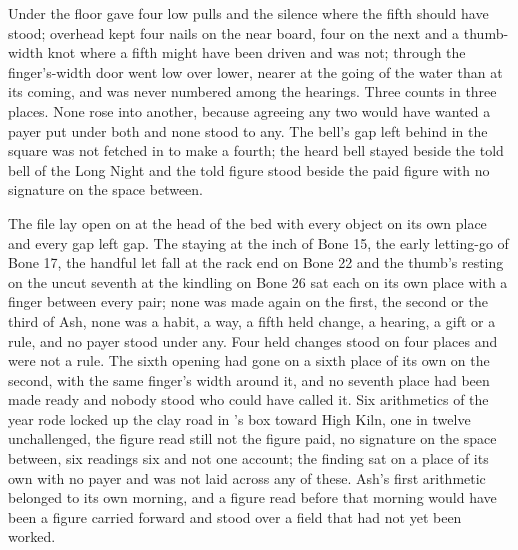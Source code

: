 Under the floor  gave four low pulls and the silence where the fifth should have stood; overhead  kept four nails on the near board, four on the next and a thumb-width knot where a fifth might have been driven and was not; through the finger's-width door  went low over lower, nearer at the going of the water than at its coming, and was never numbered among the hearings. Three counts in three places. None rose into another, because agreeing any two would have wanted a payer put under both and none stood to any. The bell's gap left behind in the square was not fetched in to make a fourth; the heard bell stayed beside the told bell of the Long Night and the told figure stood beside the paid figure with no signature on the space between.

The file lay open on  at the head of the bed with every object on its own place and every gap left gap. The staying at the inch of Bone 15, the early letting-go of Bone 17, the handful let fall at the rack end on Bone 22 and the thumb's resting on the uncut seventh at the kindling on Bone 26 sat each on its own place with a finger between every pair; none was made again on the first, the second or the third of Ash, none was a habit, a way, a fifth held change, a hearing, a gift or a rule, and no payer stood under any. Four held changes stood on four places and were not a rule. The sixth opening had gone on a sixth place of its own on the second, with the same finger's width around it, and no seventh place had been made ready and nobody stood who could have called it. Six arithmetics of the year rode locked up the clay road in 's box toward High Kiln, one in twelve unchallenged, the figure read still not the figure paid, no signature on the space between, six readings six and not one account; the finding sat on a place of its own with no payer and was not laid across any of these. Ash's first arithmetic belonged to its own morning, and a figure read before that morning would have been a figure carried forward and stood over a field that had not yet been worked.

